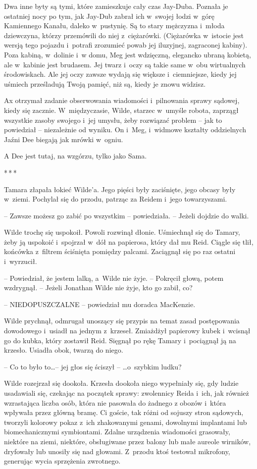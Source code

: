 \documentclass[oneside,polish,11pt,sfheadings]{mwbk}
\newcommand{\threeast}{\bigskip\par\centerline{*\,*\,*}\medskip\par}
\begin{document}
Dwa inne byty są tymi, które zamieszkuje cały czas Jay-Duba. Poznała je
ostatniej nocy po tym, jak Jay-Dub zabrał ich w~swojej łodzi w~górę
Kamiennego Kanału, daleko w~pustynię. Są to stary mężczyzna i~młoda
dziewczyna, którzy przemówili do niej z~ciężarówki. (Ciężarówka w~istocie jest wersją tego pojazdu i~potrafi zrozumieć powab jej
iluzyjnej, zagraconej kabiny). Poza kabiną, w~dolinie i~w domu, Meg
jest wdzięczną, elegancko ubraną kobietą, ale w~kabinie jest brudasem.
Jej twarz i~oczy są takie same w~obu wirtualnych środowiskach. Ale jej
oczy zawsze wydają się większe i~ciemniejsze, kiedy jej uśmiech
prześladują Twoją pamięć, niż są, kiedy je znowu widzisz.

Ax otrzymał zadanie obserwowania wiadomości i~pilnowania sprawy sądowej,
kiedy się zacznie. W~międzyczasie, Wilde, starzec w~umyśle robota,
zaprzągł wszystkie zasoby swojego i~jej umysłu, żeby rozwiązać problem -- jak to powiedział -- niezależnie od wyniku. On i~Meg, i~widmowe kształty
oddzielnych Jaźni Dee biegają jak mrówki w~ogniu.

A Dee jest tutaj, na wzgórzu, tylko jako Sama.

\threeast

Tamara złapała łokieć Wilde'a. Jego pięści były zaciśnięte, jego obcasy
były w~ziemi. Pochylał się do przodu, patrząc za Reidem i~jego
towarzyszami.

-- Zawsze możesz go zabić po wszystkim -- powiedziała. -- Jeżeli dojdzie do
walki.

Wilde trochę się uspokoił. Powoli rozwinął dłonie. Uśmiechnął się do
Tamary, żeby ją uspokoić i~spojrzał w~dół na papierosa, który dał mu
Reid. Ciągle się tlił, końcówka z~filtrem ściśnięta pomiędzy palcami.
Zaciągnął się po raz ostatni i~wyrzucił.

-- Powiedział, że jestem lalką, a~Wilde nie żyje. -- Pokręcił głową, potem
wzdrygnął. -- Jeżeli Jonathan Wilde nie żyje, kto go zabił, co?

-- NIEDOPUSZCZALNE -- powiedział mu doradca MacKenzie.

Wilde prychnął, odmrugał unoszący się przypis na temat zasad
postępowania dowodowego i~usiadł na jednym z~krzeseł. Zmiażdżył
papierowy kubek i~wcisnął go do kubka, który zostawił Reid. Sięgnął po
rękę Tamary i~pociągnął ją na krzesło. Usiadła obok, twarzą do niego.

-- Co to było to\ldots -- jej głos się ściszył -- \ldots o~szybkim ludku?

Wilde rozejrzał się dookoła. Krzesła dookoła niego wypełniały się, gdy
ludzie usadawiali się, czekając na początek sprawy: zwolennicy Reida i~ich, jak również wzrastająca liczba osób, która nie pasowała do żadnego
z obozów i~która wpływała przez główną bramę. Ci goście, tak różni od
sojuszy stron sądowych, tworzyli kolorowy pokaz z~ich zhakowanymi
genami, dowolnymi implantami lub biomechanicznymi symbiontami. Zdalne
urządzenia wiadomości grasowały, niektóre na ziemi, niektóre,
obsługiwane przez balony lub małe aureole wirników, dryfowały lub
unosiły się nad głowami. Z~przodu ktoś testował mikrofony, generując
wycia sprzężenia zwrotnego.
\end{document}
